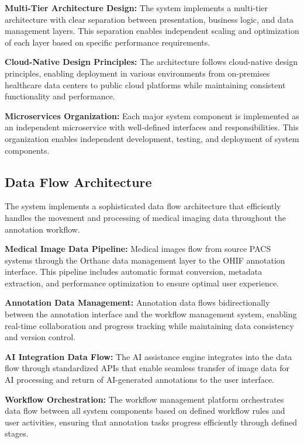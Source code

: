 \textbf{Multi-Tier Architecture Design:} The system implements a multi-tier architecture with clear separation between presentation, business logic, and data management layers. This separation enables independent scaling and optimization of each layer based on specific performance requirements.

\textbf{Cloud-Native Design Principles:} The architecture follows cloud-native design principles, enabling deployment in various environments from on-premises healthcare data centers to public cloud platforms while maintaining consistent functionality and performance.

\textbf{Microservices Organization:} Each major system component is implemented as an independent microservice with well-defined interfaces and responsibilities. This organization enables independent development, testing, and deployment of system components.

\subsection{Data Flow Architecture}

The system implements a sophisticated data flow architecture that efficiently handles the movement and processing of medical imaging data throughout the annotation workflow.

\textbf{Medical Image Data Pipeline:} Medical images flow from source PACS systems through the Orthanc data management layer to the OHIF annotation interface. This pipeline includes automatic format conversion, metadata extraction, and performance optimization to ensure optimal user experience.

\textbf{Annotation Data Management:} Annotation data flows bidirectionally between the annotation interface and the workflow management system, enabling real-time collaboration and progress tracking while maintaining data consistency and version control.

\textbf{AI Integration Data Flow:} The AI assistance engine integrates into the data flow through standardized APIs that enable seamless transfer of image data for AI processing and return of AI-generated annotations to the user interface.

\textbf{Workflow Orchestration:} The workflow management platform orchestrates data flow between all system components based on defined workflow rules and user activities, ensuring that annotation tasks progress efficiently through defined stages.

